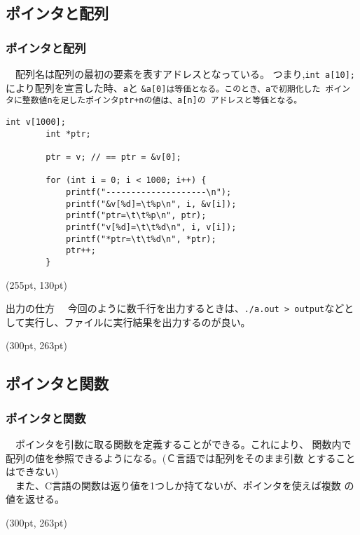 \documentclass[dvipdfmx]{beamer}
\begin{document}
\subsection{ポインタと配列}
\begin{frame}[t, fragile]
    \frametitle{ポインタと配列}
    　配列名は配列の最初の要素を表すアドレスとなっている。
    つまり,\texttt{int a[10];}により配列を宣言した時、\texttt{a}と
    \verb|&|\texttt{a[0]は等価となる。このとき、aで初期化した
    ポインタに整数値nを足したポインタptr+nの値は、a[n]の
    アドレスと等価となる。}
    \begin{lstlisting}[gobble=8, caption=Exercise]
        int v[1000];
        int *ptr;

        ptr = v; // == ptr = &v[0];

        for (int i = 0; i < 1000; i++) {
            printf("--------------------\n");
            printf("&v[%d]=\t%p\n", i, &v[i]);
            printf("ptr=\t\t%p\n", ptr);
            printf("v[%d]=\t\t%d\n", i, v[i]);
            printf("*ptr=\t\t%d\n", *ptr);
            ptr++;
        }
    \end{lstlisting}
    \begin{textblock*}{0.3\linewidth}(255pt, 130pt)
        \begin{itembox}[l]{出力の仕方}
            　今回のように数千行を出力するときは、\texttt{./a.out > output}などとして実行し、ファイルに実行結果を出力するのが良い。
        \end{itembox}
    \end{textblock*}
    \begin{textblock*}{0.3\linewidth}(300pt, 263pt)
        \space
    \end{textblock*}
\end{frame}

\subsection{ポインタと関数}
\begin{frame}[c, fragile]
    \frametitle{ポインタと関数}
    　ポインタを引数に取る関数を定義することができる。これにより、
    関数内で配列の値を参照できるようになる。(Ｃ言語では配列をそのまま引数
    とすることはできない)\\
    　また、C言語の関数は返り値を1つしか持てないが、ポインタを使えば複数
    の値を返せる。
    \begin{textblock*}{0.3\linewidth}(300pt, 263pt)
        \space
    \end{textblock*}
\end{frame}
\end{document}
